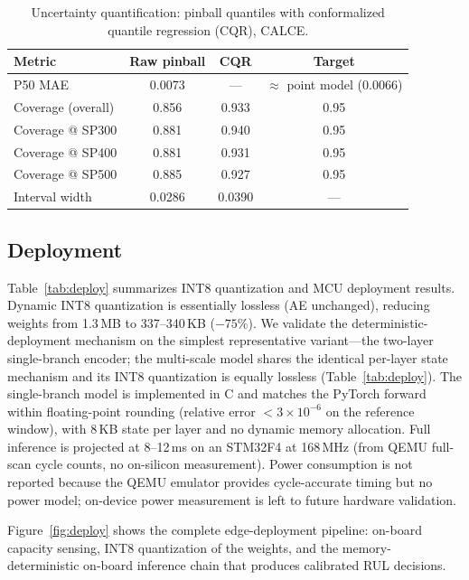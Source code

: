 \begin{table}[htbp]
\centering
\caption{Uncertainty quantification: pinball quantiles with
conformalized quantile regression (CQR), CALCE.}
\label{tab:quantile}
\begin{tabular}{lccc}
\toprule
Metric & Raw pinball & CQR & Target \\
\midrule
P50 MAE & 0.0073 & --- & $\approx$ point model (0.0066) \\
Coverage (overall) & 0.856 & 0.933 & 0.95 \\
Coverage @ SP300 & 0.881 & 0.940 & 0.95 \\
Coverage @ SP400 & 0.881 & 0.931 & 0.95 \\
Coverage @ SP500 & 0.885 & 0.927 & 0.95 \\
Interval width & 0.0286 & 0.0390 & --- \\
\bottomrule
\end{tabular}
\end{table}

\subsection{Deployment}
\label{sec:deploy}

Table~\ref{tab:deploy} summarizes INT8 quantization and MCU
deployment results. Dynamic INT8 quantization is essentially lossless
(AE unchanged), reducing weights from 1.3\,MB to 337--340\,KB
($-75\%$). We validate the deterministic-deployment mechanism on the
simplest representative variant---the two-layer single-branch
encoder; the multi-scale model shares the identical per-layer state
mechanism and its INT8 quantization is equally lossless
(Table~\ref{tab:deploy}). The single-branch model is implemented in
C and matches the PyTorch forward within floating-point rounding
(relative error $< 3\times10^{-6}$ on the reference window), with
8\,KB state per layer and no dynamic memory allocation. Full
inference is projected at 8--12\,ms on an STM32F4 at 168\,MHz
(from QEMU full-scan cycle counts, no on-silicon measurement). Power
consumption is not reported because the QEMU emulator provides
cycle-accurate timing but no power model; on-device power measurement
is left to future hardware validation.

Figure~\ref{fig:deploy} shows the complete edge-deployment
pipeline: on-board capacity sensing, INT8 quantization of the
weights, and the memory-deterministic on-board inference chain
that produces calibrated RUL decisions.

